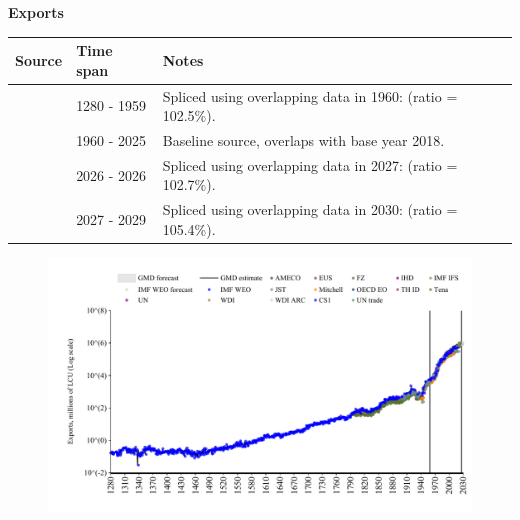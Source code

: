 \documentclass[12pt,a4paper,landscape]{article}
\begin{document}
\begin{adjustbox}{max totalsize={\paperwidth}{\paperheight},center}
\begin{minipage}[t][\textheight][t]{\textwidth}
\vspace*{0.5cm}
{}
\begin{center}
{\Large\bfseries Exports}
\end{center}
\vspace{0.5cm}
\begin{table}[H]
\centering
\small
\begin{tabular}{|l|l|l|}
\hline
\textbf{Source} & \textbf{Time span} & \textbf{Notes} \\
\hline
\rowcolor{white}\cite{CS1_GBR}& 1280 - 1959 &Spliced using overlapping data in 1960: (ratio = 102.5\%). \\
\rowcolor{lightgray}\cite{OECD_EO}& 1960 - 2025 &Baseline source, overlaps with base year 2018. \\
\rowcolor{white}\cite{AMECO}& 2026 - 2026 &Spliced using overlapping data in 2027: (ratio = 102.7\%). \\
\rowcolor{lightgray}\cite{IMF_WEO_forecast}& 2027 - 2029 &Spliced using overlapping data in 2030: (ratio = 105.4\%). \\
\hline
\end{tabular}
\end{table}
\begin{figure}[H]
\centering
\includegraphics[width=\textwidth,height=0.6\textheight,keepaspectratio]{graphs/GBR_exports.pdf}
\end{figure}
\end{minipage}
\end{adjustbox}
\end{document}
